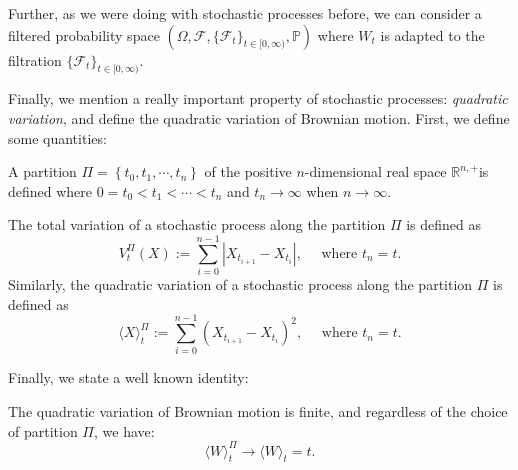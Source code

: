 Further, as we were doing with stochastic processes before, we can consider a filtered probability space $(\Omega, \mathcal{F}, \{\mathcal{F}_t\}_{t \in [0, \infty)}, \mathbb{P})$ where $W_t$ is adapted to the filtration $\{\mathcal{F}_t\}_{t \in [0, \infty)}$. 


Finally, we mention a really important property of stochastic processes: \emph{quadratic variation}, and define the quadratic variation of Brownian motion. First, we define some quantities:\label{ntn:partitions}
\begin{definition}[Partitions]
    A partition $\Pi=\left\{t_0, t_1, \cdots, t_n\right\}$ of the positive $n$-dimensional real space $\mathbb{R}^{n,+}$is defined where $0=t_0<t_1<\cdots<t_n$ and $t_n \rightarrow \infty$ when $n \rightarrow \infty$.
\end{definition}
\begin{definition}
    The total variation of a stochastic process along the partition $\Pi$ is defined as\label{ntn:total_variation}
    \[
    V_t^{\Pi}(X):=\sum_{i=0}^{n-1}\left|X_{t_{i+1}}-X_{t_i}\right|, \quad \text { where } t_n=t.
    \]
    Similarly, the quadratic variation of a stochastic process along the partition $\Pi$ is defined as\label{ntn:quadratic_variation}
    \[
    \langle X \rangle_t^{\Pi} :=\sum_{i=0}^{n-1}\left(X_{t_{i+1}}-X_{t_i}\right)^2, \quad \text { where } t_n=t.
    \]
\end{definition}    
Finally, we state a well known identity:
\begin{definition}
The quadratic variation of Brownian motion is finite, and regardless of the choice of partition $\Pi$, we have:
\[
    \langle W \rangle_t^{\Pi} \rightarrow \langle W \rangle_t = t.
\]
\end{definition}


